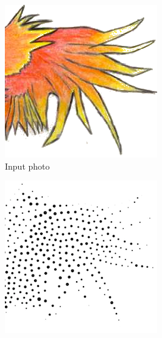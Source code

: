 \documentclass[11pt]{article}
\begin{document}
\begin{figure}[H]
    \centering
            \begin{subfigure}{0.3\textwidth}
        \centering
        \includegraphics[width=\textwidth]{../images/phoenix_small.png}
 \caption{Input photo}
    \end{subfigure}
        \begin{subfigure}{0.3\textwidth}
        \centering
        \includegraphics[width=\textwidth]{../images/phoenix_stipple_small.png}

\end{subfigure}
\end{figure}
\end{document}
